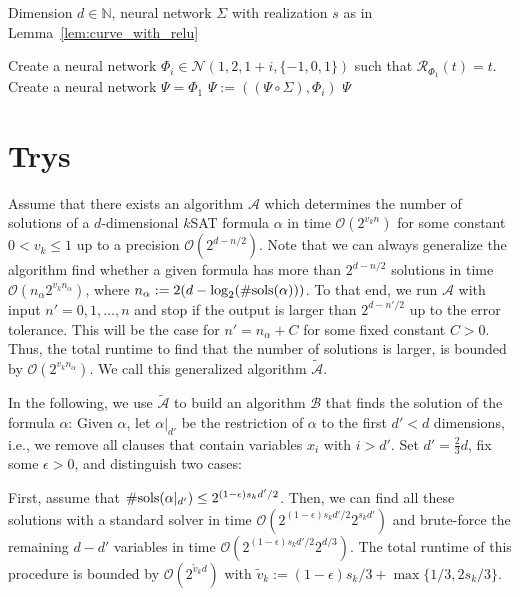 \documentclass{amsart}[11pt]
\numberwithin{equation}{section}
\newcommand{\nn}{\mathcal{N}}
\newcommand{\realization}{\mathcal{R}}
\numberwithin{theorem}{section}
\begin{document}
\begin{algorithm}[H]
\caption{Constructing the Orthant Visiting Curve $f_d$}
\label{alg:construct_fd}
\begin{algorithmic}[1]
\REQUIRE Dimension $d \in \mathbb{N}$, neural network $\Sigma$ with realization $s$ as in Lemma~\ref{lem:curve_with_relu}

\STATE Create a neural network $\Phi_i \in \nn(1, 2, 1 + i, \{-1, 0, 1\})$ such that $\realization_{\Phi_1}(t) = t$.
\STATE Create a neural network $\Psi = \Phi_1$
    \STATE $\Psi := \left((\Psi \circ \Sigma), \Phi_{i}\right)$
\ENDFOR
\RETURN $\Psi$
\end{algorithmic}
\end{algorithm}


\section{Trys}



Assume that there exists an algorithm $\mathcal{A}$ which determines the number of solutions of a $d$-dimensional $k$SAT formula $\alpha$ in time $\mathcal{O}(2^{v_k n})$ for some constant $0 < v_k \le 1$ up to a precision $\mathcal{O}(2^{d-n/2})$. 
Note that we can always generalize the algorithm find whether a given formula has more than $2^{d-n/2}$ solutions in time $\mathcal{O}(n_\alpha 2^{v_kn_\alpha})$, where $n_\alpha:=2(d-\log_2(\#{\rm sols}(\alpha)))$. To that end, we run $\mathcal{A}$ with input $n'=0,1,\ldots, n$ and stop if the output is larger than $2^{d-n'/2}$ up to the error tolerance. This will be the case for $n'= n_\alpha +C$ for some fixed constant $C>0$. Thus, the total runtime to find that the number of solutions is larger, is bounded by $\mathcal{O}(2^{v_k n_\alpha})$. We call this generalized algorithm $\widetilde{\mathcal{A}}$.

\bigskip

In the following, we use $\widetilde{\mathcal{A}}$ to build an algorithm $\mathcal{B}$ that finds the solution of the formula $\alpha$: Given $\alpha$, let $\alpha|_{d'}$ be the restriction of $\alpha$ to the first $d' < d$ dimensions, i.e., we remove all clauses that contain variables $x_i$ with $i > d'$. Set $d' = \frac{2}{3}d$, fix some $\epsilon > 0$, and distinguish two cases:

\bigskip
First, assume that $\#{\rm sols}(\alpha|_{d'}) \le 2^{(1-\epsilon)s_k d'/2}$. Then, we can find all these solutions with a standard solver in time $\mathcal{O}(2^{(1-\epsilon)s_k d'/2} 2^{s_k d'})$ and brute-force the remaining $d - d'$ variables in time $\mathcal{O}(2^{(1-\epsilon)s_k d'/2}2^{d/3})$.
The total runtime of this procedure is bounded by $\mathcal{O}(2^{\widetilde v_k d})$ with $\widetilde v_k:=(1-\epsilon)s_k/3 + \max\{1/3,2s_k/3\}$.
    
\end{document}
